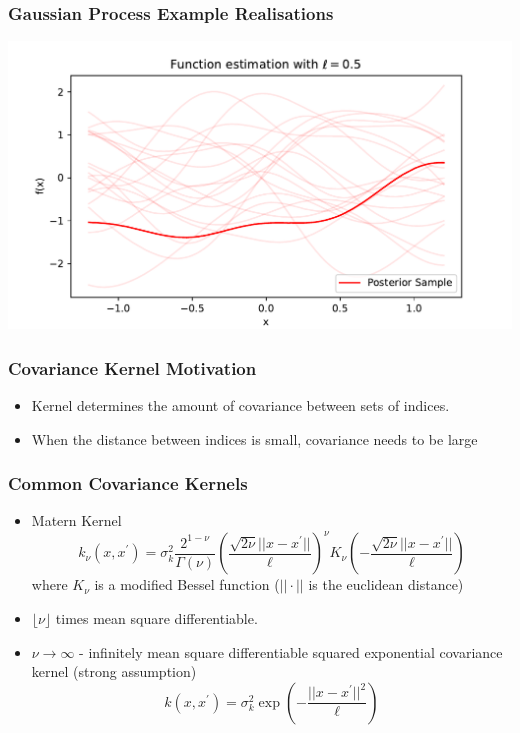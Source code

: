 \documentclass{beamer}
\begin{document}
\begin{frame}
    \frametitle{Gaussian Process Example Realisations}
    \includegraphics[width=\textwidth]{exponentiated_ell_5_tenths.pdf}
\end{frame}

\begin{frame}
    \frametitle{Covariance Kernel Motivation}\begin{itemize}
        \item Kernel determines the amount of covariance between sets of indices.
        \item When the distance between indices is small, covariance needs to be large
    \end{itemize}
\end{frame}

\begin{frame}
    \frametitle{Common Covariance Kernels}
    \begin{itemize}
        \item Matern Kernel
              $$k_\nu(x, x^\prime)
                  = \sigma^2_k\frac{2^{1 - \nu}}{\Gamma(\nu)}
                  \left(\frac{\sqrt{2\nu}||x - x^\prime||}{\ell}\right)^\nu
                  K_\nu\left(-\frac{\sqrt{2\nu}||x - x^\prime||}{\ell}\right)$$ where $K_\nu$ is a modified Bessel function ($||\cdot||$ is the euclidean distance)
        \item $\lfloor{\nu}\rfloor$ times mean square differentiable.
        \item $\nu\to\infty$ - infinitely mean square differentiable squared
              exponential covariance kernel (strong assumption)
              $$k(x, x^\prime) = \sigma^2_k\exp(-\frac{||x - x^\prime||^2}{\ell})$$
    \end{itemize}
\end{frame}
\end{document}
